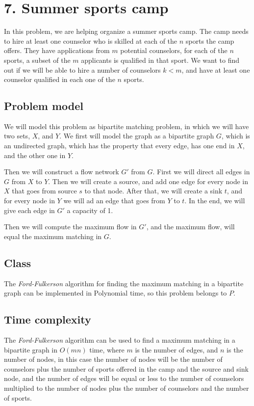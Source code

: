 \documentclass{article}
\begin{document}
\section*{7. Summer sports camp}

In this problem, we are helping organize a summer sports camp. The camp needs to hire at least one counselor who is skilled at each of the $n$ sports the camp offers. They have applications from $m$ potential counselors, for each of the $n$ sports, a subset of the $m$ applicants is qualified in that sport. We want to find out if we will be able to hire a number of counselors $k<m$, and have at least one counselor qualified in each one of the $n$ sports. 

\subsection*{Problem model}

We will model this problem as bipartite matching problem, in which we will have two sets, $X$, and $Y$. We first will model the graph as a bipartite graph $G$, which is an undirected graph, which has the property that every edge, has one end in $X$, and the other one in $Y$.

Then we will construct a flow network $G'$ from $G$. First we will direct all edges in $G$ from $X$ to $Y$. Then we will create a source, and add one edge for every node in $X$ that goes from source $s$ to that node. After that, we will create a sink $t$, and for every node in $Y$ we will ad an edge that goes from $Y$ to $t$. In the end, we will give each edge in $G'$ a capacity of 1.

Then we will compute the maximum flow in $G'$, and the maximum flow, will equal the maximum matching in $G$.

\subsection*{Class}

The \textit{Ford-Fulkerson} algorithm for finding the maximum matching in a bipartite graph can be implemented in Polynomial time, so this problem belongs to $P$.

\subsection*{Time complexity}

The \textit{Ford-Fulkerson} algorithm can be used to find a maximum matching in a bipartite graph in $O(mn)$ time, where $m$ is the number of edges, and $n$ is the number of nodes, in this case the number of nodes will be the number of counselors plus the number of sports offered in the camp and the source and sink node, and the number of edges will be equal or less to the number of counselors multiplied to the number of nodes plus the number of counselors and the number of sports.
\end{document}
